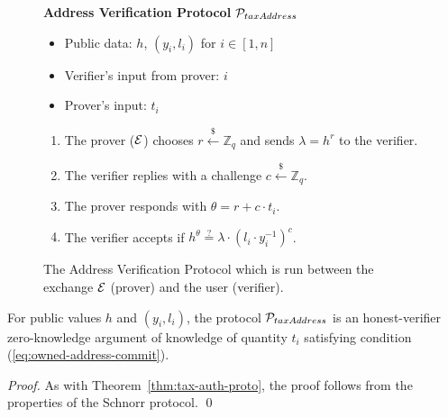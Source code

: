 \begin{figure}[h]
\begin{mdframed}

\begin{center}
    \textbf{Address Verification Protocol} $\mathcal{P}_{taxAddress}$
\end{center}

    \begin{itemize}
        \item Public data: $h$, $(y_i, l_i)$ for $i \in [1, n]$
        \item Verifier's input from prover: $i$
        \item Prover's input: $t_i$
    \end{itemize}

    \begin{enumerate}
        \item The prover ($\mathcal{E}$) chooses $r \xleftarrow{\$} \mathbb{Z}_q$
            and sends $\lambda = h^r$ to the verifier.
        \item The verifier replies with a challenge $c \xleftarrow{\$} \mathbb{Z}_q$.
        \item The prover responds with $\theta = r + c \cdot t_i$.
        \item The verifier accepts if $h^\theta \stackrel{?}{=} \lambda \cdot (l_i \cdot y_i^{-1})^c$.
    \end{enumerate}

\end{mdframed}
\caption{
    The Address Verification Protocol which is run between the exchange $\mathcal{E}$
    (prover) and the user (verifier).
}
\label{fig:taxation_verification_proto}
\end{figure}

\begin{theorem}
    For public values $h$ and $(y_i, l_i)$, the protocol
    $\mathcal{P}_{taxAddress}$ is an honest-verifier zero-knowledge argument of
    knowledge of quantity $t_i$ satisfying condition (\ref{eq:owned-address-commit}).
\end{theorem}
\begin{proof}
    As with Theorem~\ref{thm:tax-auth-proto}, the proof follows from the
    properties of the Schnorr protocol. \qed
\end{proof}
